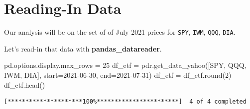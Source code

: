 \documentclass[
  letterpaper,
  DIV=11,
  numbers=noendperiod]{scrreprt}
\newenvironment{Shaded}{\begin{snugshade}}{\end{snugshade}}
\newcommand{\BuiltInTok}[1]{\textcolor[rgb]{0.00,0.23,0.31}{#1}}
\newcommand{\DecValTok}[1]{\textcolor[rgb]{0.68,0.00,0.00}{#1}}
\newcommand{\NormalTok}[1]{\textcolor[rgb]{0.00,0.23,0.31}{#1}}
\newcommand{\OperatorTok}[1]{\textcolor[rgb]{0.37,0.37,0.37}{#1}}
\newcommand{\StringTok}[1]{\textcolor[rgb]{0.13,0.47,0.30}{#1}}
\begin{document}
\hypertarget{reading-in-data-5}{%
\section{Reading-In Data}\label{reading-in-data-5}}

Our analysis will be on the set of of July 2021 prices for \texttt{SPY},
\texttt{IWM}, \texttt{QQQ}, \texttt{DIA}.

Let's read-in that data with \textbf{pandas\_datareader}.

\begin{Shaded}
\begin{Highlighting}[]
\NormalTok{pd.options.display.max\_rows }\OperatorTok{=} \DecValTok{25}
\NormalTok{df\_etf }\OperatorTok{=}\NormalTok{ pdr.get\_data\_yahoo([}\StringTok{\textquotesingle{}SPY\textquotesingle{}}\NormalTok{, }\StringTok{\textquotesingle{}QQQ\textquotesingle{}}\NormalTok{, }\StringTok{\textquotesingle{}IWM\textquotesingle{}}\NormalTok{, }\StringTok{\textquotesingle{}DIA\textquotesingle{}}\NormalTok{], start}\OperatorTok{=}\StringTok{\textquotesingle{}2021{-}06{-}30\textquotesingle{}}\NormalTok{, end}\OperatorTok{=}\StringTok{\textquotesingle{}2021{-}07{-}31\textquotesingle{}}\NormalTok{)}
\NormalTok{df\_etf }\OperatorTok{=}\NormalTok{ df\_etf.}\BuiltInTok{round}\NormalTok{(}\DecValTok{2}\NormalTok{)}
\NormalTok{df\_etf.head()}
\end{Highlighting}
\end{Shaded}

\begin{verbatim}
[*********************100%***********************]  4 of 4 completed
\end{verbatim}
\end{document}

